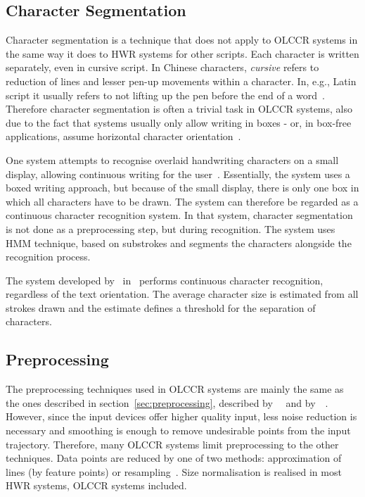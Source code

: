 \subsection{Character Segmentation}
\label{sec:olccr:charactersegmentation}

Character segmentation is a technique that does not apply to OLCCR systems in
the same way it does to HWR systems for other scripts. Each character is
written separately, even in cursive script. In Chinese characters, \emph{cursive}
refers to reduction of lines and lesser pen-up movements within a character.
In, e.g., Latin script it usually refers to not lifting up the pen before the end
of a word~. Therefore character segmentation is often a
trivial task in OLCCR systems, also due to the fact that systems usually only
allow writing in boxes - or, in box-free applications, assume horizontal 
character orientation~.

One system attempts to recognise overlaid handwriting characters on a small 
display, allowing continuous writing for the user~.
Essentially, the system uses a boxed writing approach, 
but because of the small display, there is only one box in which 
all characters have to be drawn. The system can therefore be regarded as a
continuous character recognition system. In that system, character segmentation 
is not done as a preprocessing step, but during recognition. The system uses 
HMM technique, based on substrokes and segments the characters alongside the 
recognition process.

The system developed by~ in~
performs continuous character recognition, regardless of the text orientation.
The average character size is estimated from all strokes drawn and the estimate
defines a threshold for the separation of characters.

\subsection{Preprocessing}
\label{sec:olccr:preprocessing}

The preprocessing techniques used in OLCCR systems are mainly the same as the
ones described in section~\ref{sec:preprocessing}, described 
by~~\citeyear{Tappert1990}
and by~~\citeyear{Santosh2009}. 
However, since the input devices offer higher 
quality input, less noise reduction is necessary and smoothing is enough to 
remove undesirable points from the input trajectory. Therefore, many OLCCR 
systems limit preprocessing to the other techniques. Data points are reduced
by one of two methods: approximation of lines (by feature points) or 
resampling~.
Size normalisation is realised in most HWR systems, OLCCR systems included.

